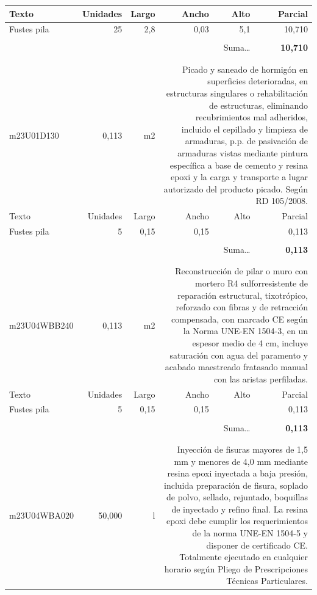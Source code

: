 \documentclass{book}%
\begin{document}
\begin{longtable}{lrrrrr}
Texto&Unidades&Largo&Ancho&Alto&Parcial\\%
\hline%
\multicolumn{1}{p{3.5cm}}{Fustes pila}&25&2,8&0,03&5,1&    10,710\\%
&&&&&\\%
\multicolumn{5}{r}{Suma\ldots}&\textbf{    10,710}\\%
\hline%
&&&&&\\%
&&&&&\\%
m23U01D130&     0,113& m2&\multicolumn{3}{p{6cm}}{\scriptsize Picado y saneado de hormigón en superficies deterioradas, en estructuras singulares o rehabilitación de estructuras, eliminando recubrimientos mal adheridos, incluido el cepillado y limpieza de armaduras, p.p. de pasivación de armaduras vistas mediante pintura específica a base de cemento y resina epoxi y la carga y transporte a lugar autorizado del producto picado. Según RD 105/2008.\normalsize}\\%
Texto&Unidades&Largo&Ancho&Alto&Parcial\\%
\hline%
\multicolumn{1}{p{3.5cm}}{Fustes pila}&5&0,15&0,15&&     0,113\\%
&&&&&\\%
\multicolumn{5}{r}{Suma\ldots}&\textbf{     0,113}\\%
\hline%
&&&&&\\%
&&&&&\\%
m23U04WBB240&     0,113& m2&\multicolumn{3}{p{6cm}}{\scriptsize Reconstrucción de pilar o muro con mortero R4 sulforresistente de reparación estructural, tixotrópico, reforzado con fibras y de retracción compensada, con marcado CE según la Norma UNE-EN 1504-3, en un espesor medio de 4 cm, incluye saturación con agua del paramento y acabado maestreado fratasado manual con las aristas perfiladas.\normalsize}\\%
Texto&Unidades&Largo&Ancho&Alto&Parcial\\%
\hline%
\multicolumn{1}{p{3.5cm}}{Fustes pila}&5&0,15&0,15&&     0,113\\%
&&&&&\\%
\multicolumn{5}{r}{Suma\ldots}&\textbf{     0,113}\\%
\hline%
&&&&&\\%
&&&&&\\%
m23U04WBA020&    50,000& l&\multicolumn{3}{p{6cm}}{\scriptsize Inyección de fisuras mayores de 1,5 mm y menores de 4,0 mm mediante resina epoxi inyectada a baja presión, incluida preparación de fisura, soplado de polvo, sellado, rejuntado, boquillas de inyectado y refino final. La resina epoxi debe cumplir los requerimientos de la norma UNE-EN 1504-5 y disponer de certificado CE. Totalmente ejecutado en cualquier horario según Pliego de Prescripciones Técnicas Particulares.\normalsize}\\%

\end{longtable}
\end{document}
